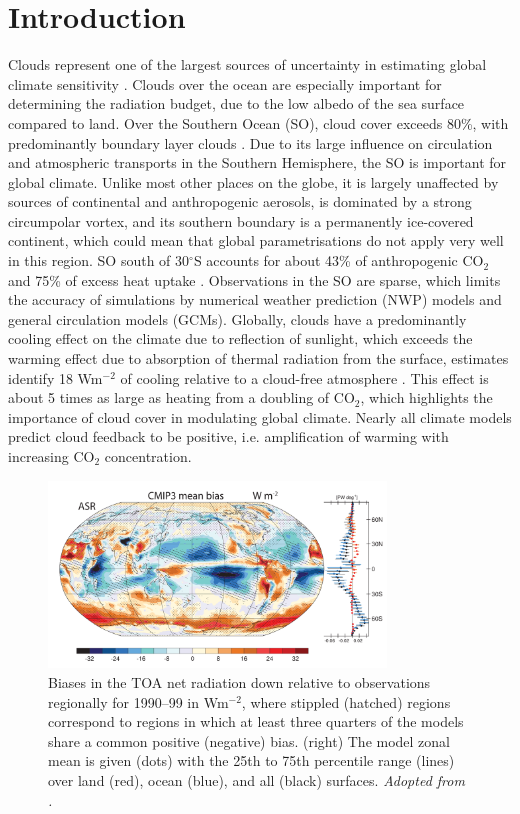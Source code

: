 \chapter{Introduction}

Clouds represent one of the largest sources of uncertainty in estimating global
climate sensitivity \citep{williams2017}. Clouds over the ocean
are especially important for determining the radiation budget, due to the
low albedo of the sea surface compared to land.
Over the Southern Ocean (SO),
cloud cover exceeds 80\%, with predominantly boundary layer clouds \citep{mace2009}.
Due to its large influence on circulation and atmospheric transports in the
Southern Hemisphere, the SO is important for global climate. Unlike
most other places on the globe, it is largely unaffected by sources of
continental and anthropogenic aerosols, is dominated by a strong circumpolar
vortex, and its southern boundary is a permanently ice-covered continent,
which could mean that global parametrisations do not apply very well in this
region.
SO south of 30$^\circ$S accounts for about 43\% of anthropogenic CO$_2$ and 75\%
of excess heat uptake \citep{frolicher2015}.
Observations in the SO are sparse, which limits the accuracy
of simulations by numerical weather prediction (NWP) models and general
circulation models (GCMs).
Globally, clouds have a predominantly cooling effect on the climate due to reflection
of sunlight, which exceeds the warming effect due to absorption of thermal
radiation from the surface, estimates identify 18 Wm$^{-2}$ of cooling relative to a cloud-free atmosphere
\citep{zelinka2017}. This effect is about 5 times as large as heating from
a doubling of CO$_2$, which highlights the importance of cloud cover in modulating
global climate. Nearly all climate models predict cloud feedback to be positive,
i.e. amplification of warming with increasing CO$_2$ concentration.

\begin{figure}[t]
\centering
\centerline{\includegraphics[width=0.8\textwidth]{fig/trenberth-fassulo-sw-bias.png}}
\caption[Biases in the TOA net radiation down]{
Biases in the TOA net radiation down relative to observations regionally for
1990--99
in Wm$^{-2}$, where stippled (hatched) regions correspond to regions
in which at least three quarters of the models share a common
positive (negative) bias. (right) The model zonal mean is given
(dots) with the 25th to 75th percentile range (lines) over land (red),
ocean (blue), and all (black) surfaces. \textit{Adopted from
\cite{trenberth2010}.}
}
\label{fig:1:trenberth-fassulo-sw-bias}
\end{figure}

